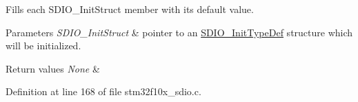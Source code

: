 Fills each S\+D\+I\+O\+\_\+\+Init\+Struct member with its default value. 


\begin{DoxyParams}{Parameters}
{\em S\+D\+I\+O\+\_\+\+Init\+Struct} & pointer to an \hyperlink{struct_s_d_i_o___init_type_def}{S\+D\+I\+O\+\_\+\+Init\+Type\+Def} structure which will be initialized. \\
\hline
\end{DoxyParams}

\begin{DoxyRetVals}{Return values}
{\em None} & \\
\hline
\end{DoxyRetVals}


Definition at line 168 of file stm32f10x\+\_\+sdio.\+c.

